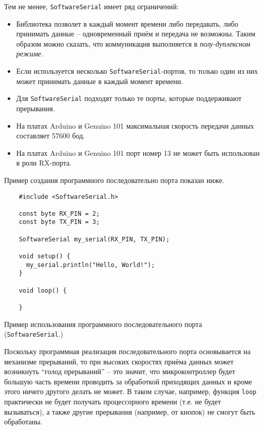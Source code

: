 \documentclass[../sparc.tex]{subfiles}
\begin{document}
Тем не менее, \texttt{SoftwareSerial} имеет ряд ограничений:
\begin{itemize}
\item Библиотека позволет в каждый момент времени либо передавать, либо
  принимать данные -- одновременный приём и передача не возможны. Таким образом
  можно сказать, что коммуникация выполняется в \emph{полу-дуплексном режиме}.
\item Если используется несколько \texttt{SoftwareSerial}-портов, то только один
  из них может принимать данные в каждый момент времени.
\item Для \texttt{SoftwareSerial} подходят только те порты, которые поддерживают
  прерывания.
\item На платах Arduino и Genuino 101 максимальная скорость передачи данных
  составляет 57600 бод.
\item На платах Arduino и Genuino 101 порт номер 13 не может быть использован в
  роли RX-порта.
\end{itemize}

Пример создания программного последовательно порта показан ниже.

\begin{listing}[H]
  \begin{verbatim}
    #include <SoftwareSerial.h>

    const byte RX_PIN = 2;
    const byte TX_PIN = 3;

    SoftwareSerial my_serial(RX_PIN, TX_PIN);

    void setup() {
      my_serial.println("Hello, World!");
    }

    void loop() {

    }
  \end{verbatim}
  \label{listing:communication-serial-software}
  \caption{Пример использования программного последовательного порта
    (\texttt{SoftwareSerial}.)}
\end{listing}

Поскольку программная реализация последовательного порта основывается на
механизме прерываний, то при высоких скоростях приёма данных может возникнуть
``голод прерываний'' -- это значит, что микроконтроллер будет большую часть
времени проводить за обработкой приходящих данных и кроме этого ничего другого
делать не может.  В таком случае, например, функция \texttt{loop} практически не
будет получать процессорного времени (т.е. не будет вызываться), а также другие
прерывания (например, от кнопок) не смогут быть обработаны.
\end{document}
